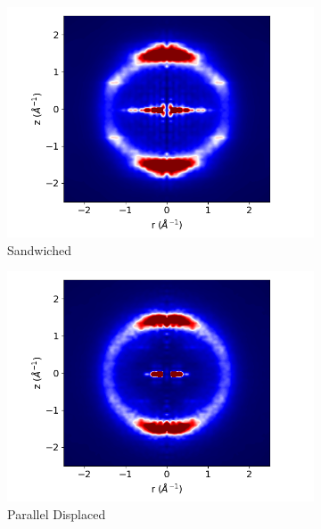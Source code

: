 \documentclass{article}
\begin{document}
\begin{figure}[h]
        \begin{subfigure}{0.475\textwidth}
                \centering
                \includegraphics[width=\textwidth]{layered_rzplot.png}
                \caption{Sandwiched}\label{fig:xrd_layered}
        \end{subfigure}
        \begin{subfigure}{0.475\textwidth}
                \centering
                \includegraphics[width=\textwidth]{offset_rzplot.png}
                \caption{Parallel Displaced}\label{fig:xrd_offset}
        \end{subfigure}
	\caption{}\label{fig:xrd_280}
\end{figure}
\end{document}
